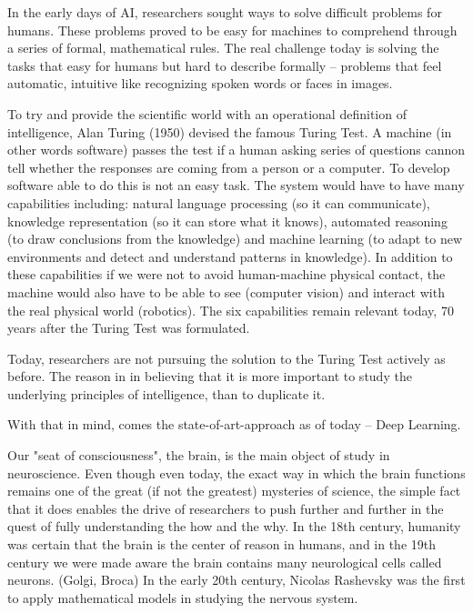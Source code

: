 \documentclass[b5paper]{book}
\let\cite\parencite
\begin{document}
In the early days of AI, researchers sought ways to solve difficult problems for humans. These problems proved to be easy for machines to comprehend through a series of formal, mathematical rules. The real challenge today is solving the tasks that easy for humans but hard to describe formally -- problems that feel automatic, intuitive like recognizing spoken words or faces in images. \cite{goodfellow2016deep}

To try and provide the scientific world with an operational definition of intelligence, Alan Turing (1950) devised the famous Turing Test. A machine (in other words software) passes the test if a human asking series of questions cannon tell whether the responses are coming from a person or a computer. To develop software able to do this is not an easy task. The system would have to have many capabilities including: natural language processing (so it can communicate), knowledge representation (so it can store what it knows), automated reasoning (to draw conclusions from the knowledge) and machine learning (to adapt to new environments and detect and understand patterns in knowledge). In addition to these capabilities if we were not to avoid human-machine physical contact, the machine would also have to be able to see (computer vision) and interact with the real physical world (robotics). The six capabilities remain relevant today, 70 years after the Turing Test was formulated.

Today, researchers are not pursuing the solution to the Turing Test actively as before. The reason in in believing that it is more important to study the underlying principles of intelligence, than to duplicate it. 

With that in mind, comes the state-of-art-approach as of today -- Deep Learning.

Our "seat of consciousness", the brain, is the main object of study in neuroscience. Even though even today, the exact way in which the brain functions remains one of the great (if not the greatest) mysteries of science, the simple fact that it does enables the drive of researchers to push further and further in the quest of fully understanding the how and the why. In the 18th century, humanity was certain that the brain is the center of reason in humans, and in the 19th century we were made aware the brain contains many neurological cells called neurons. (Golgi, Broca) In the early 20th century, Nicolas Rashevsky was the first to apply mathematical models in studying the nervous system. 
\end{document}
